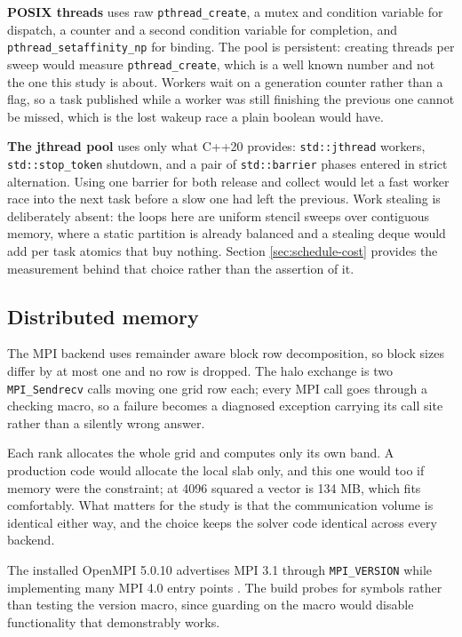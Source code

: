 \textbf{POSIX threads} uses raw \texttt{pthread\_create}, a mutex and condition
variable for dispatch, a counter and a second condition variable for completion,
and \texttt{pthread\_setaffinity\_np} for binding. The pool is persistent:
creating threads per sweep would measure \texttt{pthread\_create}, which is a
well known number and not the one this study is about. Workers wait on a
generation counter rather than a flag, so a task published while a worker was
still finishing the previous one cannot be missed, which is the lost wakeup race
a plain boolean would have.

\textbf{The jthread pool} uses only what C++20 provides: \texttt{std::jthread}
workers, \texttt{std::stop\_token} shutdown, and a pair of \texttt{std::barrier}
phases entered in strict alternation. Using one barrier for both release and
collect would let a fast worker race into the next task before a slow one had
left the previous. Work stealing is deliberately absent: the loops here are
uniform stencil sweeps over contiguous memory, where a static partition is
already balanced and a stealing deque would add per task atomics that buy
nothing. Section \ref{sec:schedule-cost} provides the measurement behind that
choice rather than the assertion of it.

\subsection{Distributed memory}

The MPI backend uses remainder aware block row decomposition, so block sizes
differ by at most one and no row is dropped. The halo exchange is two
\texttt{MPI\_Sendrecv} calls moving one grid row each; every MPI call goes
through a checking macro, so a failure becomes a diagnosed exception carrying
its call site rather than a silently wrong answer.

Each rank allocates the whole grid and computes only its own band. A production
code would allocate the local slab only, and this one would too if memory were
the constraint; at 4096 squared a vector is 134 MB, which fits comfortably. What
matters for the study is that the communication volume is identical either way,
and the choice keeps the solver code identical across every backend.

The installed OpenMPI 5.0.10 advertises MPI 3.1 through \texttt{MPI\_VERSION}
while implementing many MPI 4.0 entry points \cite{mpi2021}. The build probes for
symbols rather than testing the version macro, since guarding on the macro would
disable functionality that demonstrably works.

